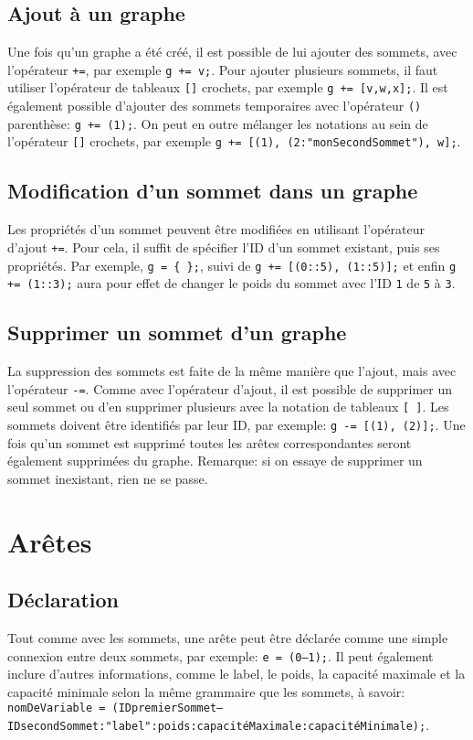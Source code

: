 \documentclass[french]{article}
\begin{document}
		\subsection{Ajout à un graphe}
		Une fois qu'un graphe a été créé, il est possible de lui ajouter des sommets, avec l'opérateur \texttt{+=}, par exemple \texttt{g += v;}. Pour ajouter plusieurs sommets, il faut utiliser l'opérateur de tableaux \texttt{[]} crochets, par exemple \texttt{g += [v,w,x];}. Il est également possible d'ajouter des sommets temporaires avec l'opérateur \texttt{()} parenthèse: \texttt{g += (1);}. On peut en outre mélanger les notations au sein de l'opérateur \texttt{[]} crochets, par exemple \texttt{g += [(1), (2:"monSecondSommet"), w];}.
		
		\subsection{Modification d'un sommet dans un graphe}
		Les propriétés d'un sommet peuvent être modifiées en utilisant l'opérateur d'ajout \texttt{+=}. Pour cela, il suffit de spécifier l'ID d'un sommet existant, puis ses propriétés. Par exemple, \texttt{g = \{ \};}, suivi de \texttt{g += [(0::5), (1::5)];} et enfin \texttt{g += (1::3);} aura pour effet de changer le poids du sommet avec l'ID \texttt{1} de \texttt{5} à \texttt{3}.
		
		\subsection{Supprimer un sommet d'un graphe}
		La suppression des sommets est faite de la même manière que l'ajout, mais avec l'opérateur \texttt{-=}. Comme avec l'opérateur d'ajout, il est possible de supprimer un seul sommet ou d'en supprimer plusieurs avec la notation de tableaux \texttt{[ ]}. Les sommets doivent être identifiés par leur ID, par exemple: \texttt{g -= [(1), (2)];}. Une fois qu'un sommet est supprimé toutes les arêtes correspondantes seront également supprimées du graphe. Remarque: si on essaye de supprimer un sommet inexistant, rien ne se passe.
		
	\section{Arêtes}
		\subsection{Déclaration}
		Tout comme avec les sommets, une arête peut être déclarée comme une simple connexion entre deux sommets, par exemple: \texttt{e = (0--1);}. Il peut également inclure d'autres informations, comme le label, le poids, la capacité maximale et la capacité minimale selon la même grammaire que les sommets, à savoir: \texttt{nomDeVariable = (IDpremierSommet--IDsecondSommet:"label":poids:capacitéMaximale:capacitéMinimale);}.
		
\end{document}

